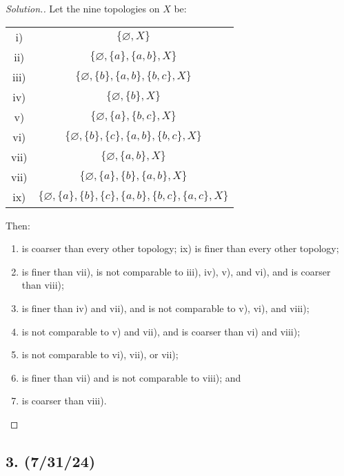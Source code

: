 \documentclass{article}
\begin{document}
\begin{proof}[Solution.]
    Let the nine topologies on $X$ be:

    \begin{center}
        \begin{tabular}{ c c }
            i) & $\{ \varnothing, X \}$ \\
            ii) & $\{ \varnothing, \{ a \}, \{ a, b \}, X \}$ \\
            iii) & $\{ \varnothing, \{ b \}, \{ a, b \}, \{ b, c \}, X \}$ \\
            iv) & $\{ \varnothing, \{ b \}, X \}$ \\
            v) & $\{ \varnothing, \{ a \}, \{ b, c \}, X \}$ \\
            vi) & $\{ \varnothing, \{ b \}, \{ c \}, \{ a, b \}, \{ b, c \}, X \}$ \\
            vii) & $\{ \varnothing, \{ a, b \}, X \}$ \\
            vii) & $\{ \varnothing, \{ a \}, \{ b \}, \{ a, b \}, X \}$ \\
            ix) & $\{ \varnothing, \{ a \}, \{ b \}, \{ c \}, \{ a, b \}, \{ b, c \}, \{ a, c \}, X \}$ \\
        \end{tabular}
    \end{center}
    Then:
    \begin{enumerate}[label=\roman{enumi})]
        \item is coarser than every other topology; ix) is finer than every other topology;
        \item is finer than vii), is not comparable to iii), iv), v), and vi), and is coarser than viii);
        \item is finer than iv) and vii), and is not comparable to v), vi), and viii);
        \item is not comparable to v) and vii), and is coarser than vi) and viii);
        \item is not comparable to vi), vii), or vii);
        \item is finer than vii) and is not comparable to viii); and
        \item is coarser than viii).
    \end{enumerate}
\end{proof}

\subsection*{3. (7/31/24)}
\end{document}
